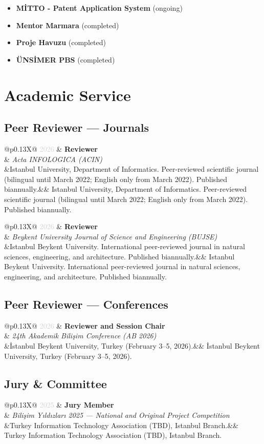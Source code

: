 \documentclass[11pt, a4paper]{article}
\makeatletter
\newcommand{\cventry}[4]{%
  \begin{tabularx}{\textwidth}{@{}p{0.13\textwidth}X@{}}
    \textcolor{lightgray}{\small #1} & \textbf{#2} \\
    & \textit{\small #3} \\
    \ifx&#4&\else & \small #4 \\ \fi
  \end{tabularx}
  \vspace{3pt}
}
\makeatother
\begin{document}
\begin{itemize}
  \item \textbf{MİTTO - Patent Application System} (ongoing)
  \item \textbf{Mentor Marmara} (completed)
  \item \textbf{Proje Havuzu} (completed)
  \item \textbf{ÜNSİMER PBS} (completed)
\end{itemize}

\section{Academic Service}

\subsection*{\normalsize\sffamily\color{accentblue} Peer Reviewer — Journals}
\vspace{4pt}

\cventry{2026}{Reviewer}{Acta INFOLOGICA (ACIN)}{Istanbul University, Department of Informatics. Peer-reviewed scientific journal (bilingual until March 2022; English only from March 2022). Published biannually.}

\cventry{2026}{Reviewer}{Beykent University Journal of Science and Engineering (BUJSE)}{Istanbul Beykent University. International peer-reviewed journal in natural sciences, engineering, and architecture. Published biannually.}

\vspace{2pt}
\subsection*{\normalsize\sffamily\color{accentblue} Peer Reviewer — Conferences}
\vspace{4pt}

\cventry{2026}{Reviewer and Session Chair}{24th Akademik Bilişim Conference (AB 2026)}{İstanbul Beykent University, Turkey (February 3--5, 2026).}

\vspace{2pt}
\subsection*{\normalsize\sffamily\color{accentblue} Jury \& Committee}
\vspace{4pt}

\cventry{2025}{Jury Member}{Bilişim Yıldızları 2025 — National and Original Project Competition}{Turkey Information Technology Association (TBD), Istanbul Branch.}
\end{document}
